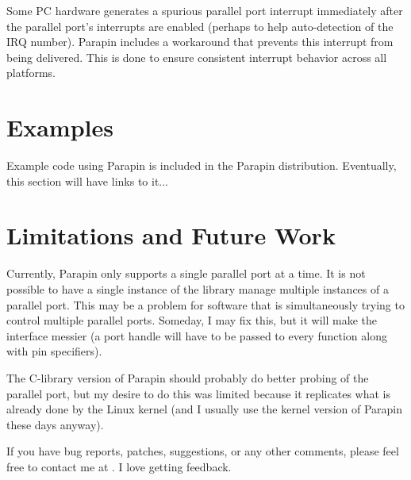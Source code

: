 \documentclass{article}
\begin{document}
Some PC hardware generates a spurious parallel port interrupt
immediately after the parallel port's interrupts are enabled (perhaps
to help auto-detection of the IRQ number).  Parapin includes a
workaround that prevents this interrupt from being delivered.  This is
done to ensure consistent interrupt behavior across all platforms.


\section{Examples}

Example code using Parapin is included in the Parapin distribution.
Eventually, this section will have links to it...

\section{Limitations and Future Work}

Currently, Parapin only supports a single parallel port at a time.  It
is not possible to have a single instance of the library manage
multiple instances of a parallel port.  This may be a problem for
software that is simultaneously trying to control multiple parallel
ports.  Someday, I may fix this, but it will make the interface
messier (a port handle will have to be passed to every function along
with pin specifiers).

The C-library version of Parapin should probably do better probing of
the parallel port, but my desire to do this was limited because it
replicates what is already done by the Linux kernel (and I usually use
the kernel version of Parapin these days anyway).

If you have bug reports, patches, suggestions, or any other comments,
please feel free to contact me at
.
I love getting feedback.
\end{document}

